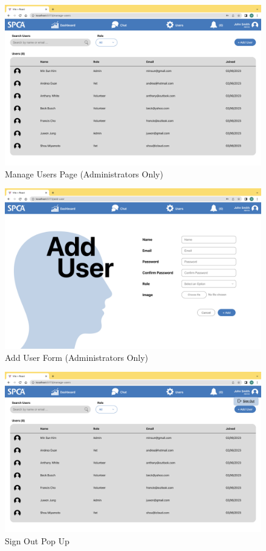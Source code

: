 \begin{figure}[h]
\centering
\includegraphics[width=\textwidth]{final-report/assets/web_manage_users.png}
\caption{Manage Users Page (Administrators Only)}
\end{figure}

\begin{figure}[h]
\centering
\includegraphics[width=\textwidth]{final-report/assets/web_add_user.png}
\caption{Add User Form (Administrators Only)}
\end{figure}

\begin{figure}[h]
\centering
\includegraphics[width=\textwidth]{final-report/assets/web_sign_out.png}
\caption{Sign Out Pop Up}
\end{figure}
